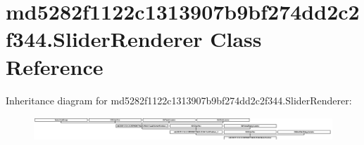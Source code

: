 \hypertarget{classmd5282f1122c1313907b9bf274dd2c2f344_1_1SliderRenderer}{}\section{md5282f1122c1313907b9bf274dd2c2f344.\+Slider\+Renderer Class Reference}
\label{classmd5282f1122c1313907b9bf274dd2c2f344_1_1SliderRenderer}
Inheritance diagram for md5282f1122c1313907b9bf274dd2c2f344.\+Slider\+Renderer\+:\begin{figure}[H]
\begin{center}
\leavevmode
\includegraphics[height=0.915033cm]{classmd5282f1122c1313907b9bf274dd2c2f344_1_1SliderRenderer}
\end{center}
\end{figure}
